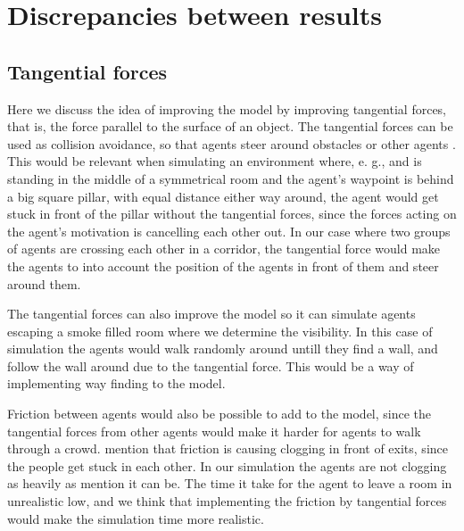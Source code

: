 \section{Discrepancies between results}
\label{sec:discrepancies}

\subsection{Tangential forces}
Here we discuss the idea of improving the model by improving tangential forces, that is, the force parallel to the surface of an object.
The tangential forces can be used as collision avoidance, so that agents steer around obstacles or other agents \cite{tang}.
This would be relevant when simulating an environment where, e. g., and is standing in the middle of a symmetrical room and the agent's waypoint
is behind a big square pillar, with equal distance either way around, the agent would get stuck in front of the pillar without the tangential forces,
since the forces acting on the agent's motivation is cancelling each other out. 
In our case where two groups of agents are crossing each other in a corridor, the tangential force would make the agents to into account
the position of the agents in front of them and steer around them.

The tangential forces can also improve the model so it can simulate agents escaping a smoke filled room where we determine the visibility.
In this case of simulation the agents would walk randomly around untill they find a wall, and follow the wall around due to the tangential force.
This would be a way of implementing way finding to the model.

Friction between agents would also be possible to add to the model, since the tangential forces from other agents would make it
harder for agents to walk through a crowd. \cite{self-org} mention that friction is causing clogging in front of exits, since the people
get stuck in each other. In our simulation the agents are not clogging as heavily as \cite{self-org} mention it can be.
The time it take for the agent to leave a room in unrealistic low, and we think that implementing the friction by tangential forces
would make the simulation time more realistic.


